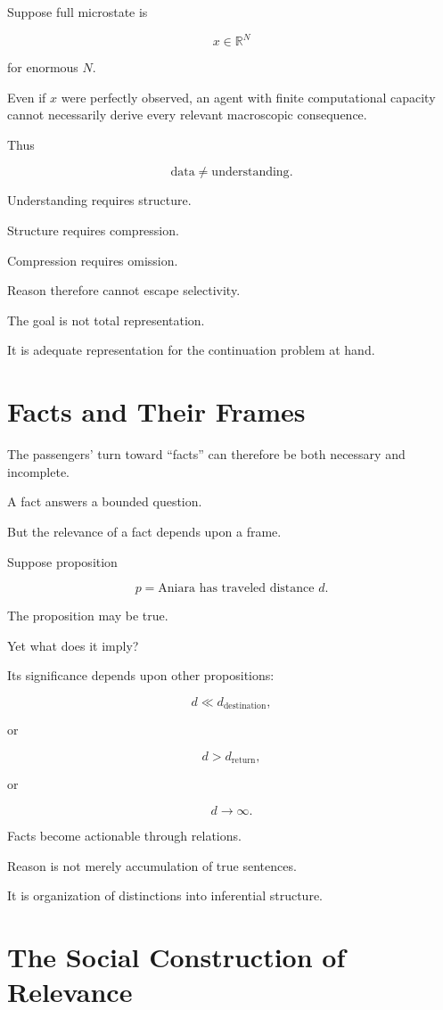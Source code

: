 \documentclass[11pt,oneside]{book}
\theoremstyle{definition}
\theoremstyle{remark}
\begin{document}
Suppose full microstate is

\[
x\in\mathbb R^N
\]

for enormous \(N\).

Even if \(x\) were perfectly observed, an agent with finite computational capacity cannot necessarily derive every relevant macroscopic consequence.

Thus

\[
\text{data}
\neq
\text{understanding}.
\]

Understanding requires structure.

Structure requires compression.

Compression requires omission.

Reason therefore cannot escape selectivity.

The goal is not total representation.

It is adequate representation for the continuation problem at hand.

\section{Facts and Their Frames}

The passengers' turn toward ``facts'' can therefore be both necessary and incomplete.

A fact answers a bounded question.

But the relevance of a fact depends upon a frame.

Suppose proposition

\[
p=\text{Aniara has traveled distance }d.
\]

The proposition may be true.

Yet what does it imply?

Its significance depends upon other propositions:

\[
d\ll d_{\mathrm{destination}},
\]

or

\[
d>d_{\mathrm{return}},
\]

or

\[
d\rightarrow\infty.
\]

Facts become actionable through relations.

Reason is not merely accumulation of true sentences.

It is organization of distinctions into inferential structure.

\section{The Social Construction of Relevance}
\end{document}
